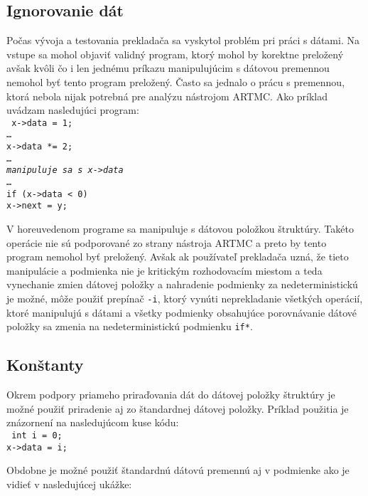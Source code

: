 \subsection{Ignorovanie dát}
Počas vývoja a testovania prekladača sa vyskytol problém pri práci s dátami. Na vstupe sa mohol objaviť validný program, ktorý mohol by korektne preložený avšak kvôli čo i len jednému príkazu manipulujúcim s dátovou premennou nemohol byť tento program preložený. Často sa jednalo o prácu s premennou, ktorá nebola nijak potrebná pre analýzu nástrojom ARTMC. Ako príklad uvádzam nasledujúci program:\\

\noindent
\texttt{
\tab x->data = 1;\\
\tab \dots\\
\tab x->data *= 2;\\
\tab \dots \\
\tab \textit{ manipuluje sa s x->data }\\
\tab \dots\\
\tab if (x->data < 0)\\
\tab \tab x->next = y;\\
}

V horeuvedenom programe sa manipuluje s dátovou položkou štruktúry. Takéto operácie nie sú podporované zo strany nástroja ARTMC a preto by tento program nemohol byť preložený. Avšak ak používateľ prekladača uzná, že tieto manipulácie a podmienka nie je kritickým rozhodovacím miestom a teda vynechanie zmien dátovej položky a nahradenie podmienky za nedeterministickú je možné, môže použiť prepínač \texttt{-i}, ktorý vynúti neprekladanie všetkých operácií, ktoré manipulujú s dátami a všetky podmienky obsahujúce porovnávanie dátové položky sa zmenia na nedeterministickú podmienku \texttt{if*}.

\subsection{Konštanty}
Okrem podpory priameho priraďovania dát do dátovej položky štruktúry je možné použiť priradenie aj zo štandardnej dátovej položky. Príklad použitia je znázornení na nasledujúcom kuse kódu:\\

\noindent
\texttt{
\tab int i = 0;\\
\tab x->data = i;\\
}

Obdobne je možné použiť štandardnú dátovú premennú aj v podmienke ako je vidieť v nasledujúcej ukážke:\\

